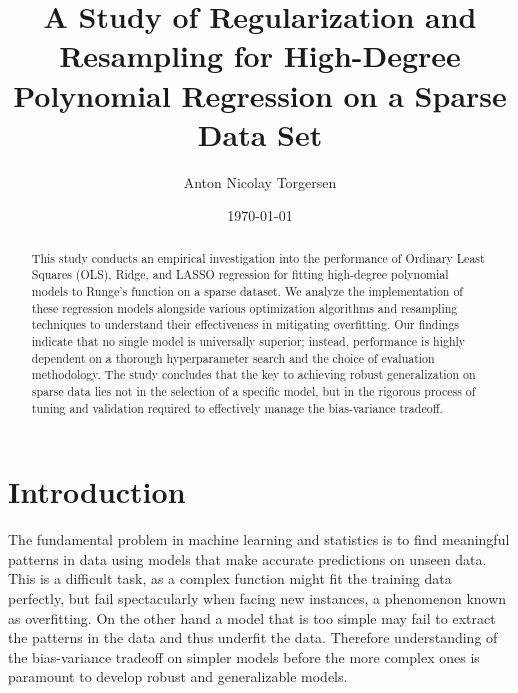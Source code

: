\documentclass[twocolumn,aps]{revtex4}
\begin{document}
\title{A Study of Regularization and Resampling for High-Degree Polynomial Regression on a Sparse Data Set}
\date{\today}               
\author{
    Anton Nicolay Torgersen 
}


\newpage



    \begin{abstract}
This study conducts an empirical investigation into the performance of Ordinary Least Squares (OLS), Ridge, and LASSO regression for fitting high-degree polynomial models to Runge's function on a sparse dataset. 
We analyze the implementation of these regression models alongside various optimization algorithms and resampling techniques to understand their effectiveness in mitigating overfitting. 
Our findings indicate that no single model is universally superior; instead, performance is highly dependent on a thorough hyperparameter search and the choice of evaluation methodology. 
The study concludes that the key to achieving robust generalization on sparse data lies not in the selection of a specific model, but in the rigorous process of tuning and validation required to effectively manage the bias-variance tradeoff.
\end{abstract}


    \maketitle
    \thispagestyle{empty} %

    


\section{Introduction}

The fundamental problem in machine learning and statistics is to find meaningful patterns in data using models that make accurate predictions on unseen data.
This is a difficult task, as a complex function might fit the training data perfectly, but fail spectacularly when facing new instances, a phenomenon known as overfitting.
On the other hand a model that is too simple may fail to extract the patterns in the data and thus underfit the data.
Therefore understanding of the bias-variance tradeoff on simpler models before the more complex ones is paramount to develop robust and generalizable models.
\end{document}
